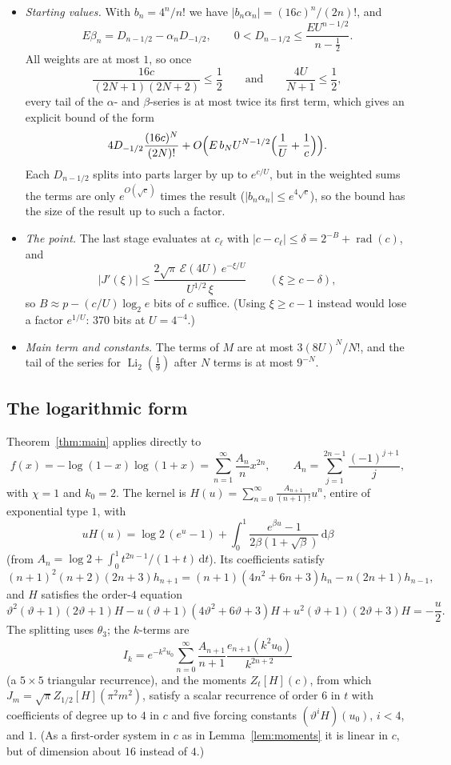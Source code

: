\documentclass[11pt,reqno]{amsart}
\theoremstyle{definition}
\theoremstyle{remark}
\newcommand{\Eip}{\mathcal{E}}
\newcommand{\Li}{\operatorname{Li}}
\newcommand{\dd}{\,\mathrm{d}}
\begin{document}
\begin{itemize}
\item \emph{Starting values.} With $b_n = 4^n/n!$ we have $|b_n\alpha_n| = (16c)^n/(2n)!$, and
\[
  E\beta_n = D_{n-1/2} - \alpha_nD_{-1/2}, \qquad 0 < D_{n-1/2} \le \frac{EU^{n-1/2}}{n-\frac12}.
\]
All weights are at most $1$, so once
\[
  \frac{16c}{(2N+1)(2N+2)} \le \frac12 \qquad\text{and}\qquad \frac{4U}{N+1} \le \frac12,
\]
every tail of the $\alpha$- and
$\beta$-series is at most twice its first term, which gives an explicit bound of the form
\[
  4D_{-1/2}\frac{(16c)^N}{(2N)!} + O\Bigl(E\,b_NU^{N-1/2}\Bigl(\frac1U + \frac1c\Bigr)\Bigr).
\]
Each $D_{n-1/2}$ splits into parts larger by up to $e^{c/U}$, but in the weighted sums the terms are only
$e^{O(\sqrt c)}$ times the result ($|b_n\alpha_n| \le e^{4\sqrt c}$), so the bound has the size of the result up to such a factor.
\item \emph{The point.} The last stage evaluates at $c_\ell$ with $|c - c_\ell| \le \delta = 2^{-B} + \operatorname{rad}(c)$, and
\[
  |J'(\xi)| \le \frac{2\sqrt\pi\,\Eip(4U)\,e^{-\xi/U}}{U^{1/2}\,\xi} \qquad (\xi \ge c - \delta),
\]
so $B \approx p - (c/U)\log_2e$ bits of $c$ suffice. (Using $\xi \ge c - 1$ instead would lose a factor
$e^{1/U}$: $370$ bits at $U = 4^{-4}$.)
\item \emph{Main term and constants.} The terms of $M$ are at most $3(8U)^N/N!$, and the tail of the series for
$\Li_2(\frac19)$ after $N$ terms is at most $9^{-N}$.
\end{itemize}

\subsection{The logarithmic form}\label{sec:logform}
Theorem~\ref{thm:main} applies directly to
\[
  f(x) = -\log(1-x)\log(1+x) = \sum_{n=1}^{\infty}\frac{A_n}{n}x^{2n}, \qquad A_n = \sum_{j=1}^{2n-1}\frac{(-1)^{j+1}}j,
\]
with $\chi = 1$ and $k_0 = 2$. The kernel is $H(u) = \sum_{n=0}^{\infty}\frac{A_{n+1}}{(n+1)!}u^n$, entire of exponential
type $1$, with
\[
  uH(u) = \log 2\,(e^u-1) + \int_0^1\frac{e^{\beta u}-1}{2\beta(1+\sqrt\beta)}\dd\beta
\]
(from $A_n = \log 2 + \int_0^1 t^{2n-1}/(1+t)\dd t$). Its coefficients satisfy
\[
  (n+1)^2(n+2)(2n+3)h_{n+1} = (n+1)(4n^2+6n+3)h_n - n(2n+1)h_{n-1},
\]
and $H$ satisfies the order-$4$ equation
\[
  \vartheta^2(\vartheta+1)(2\vartheta+1)H - u(\vartheta+1)(4\vartheta^2+6\vartheta+3)H
  + u^2(\vartheta+1)(2\vartheta+3)H = -\frac u2.
\]
The splitting uses $\theta_3$; the $k$-terms are
\[
  I_k = e^{-k^2u_0}\sum_{n=0}^{\infty}\frac{A_{n+1}}{n+1}\frac{e_{n+1}(k^2u_0)}{k^{2n+2}}
\]
(a $5\times5$ triangular recurrence), and the moments $Z_t[H](c)$, from which $J_m = \sqrt\pi Z_{1/2}[H](\pi^2m^2)$,
satisfy a scalar
recurrence of order $6$ in $t$ with coefficients of degree up to $4$ in $c$ and five forcing constants
$(\vartheta^iH)(u_0)$, $i < 4$, and $1$. (As a first-order system in $c$ as in Lemma~\ref{lem:moments} it is linear in $c$,
but of dimension about $16$ instead of $4$.)
\end{document}
